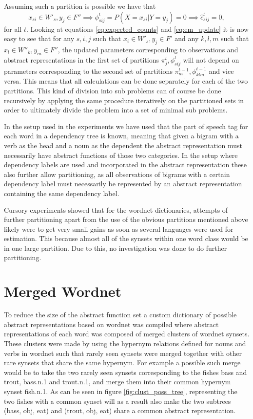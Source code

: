 Assuming such a partition is possible we have that
\begin{equation*}
    x_{si}\in W'_s, y_j\in F'' \implies \phi^t_{sij}=P(X = x_{si}|Y = y_j)=0 \implies \hat c^t_{sij}=0,
\end{equation*}
for all $t$. Looking at equations \ref{eq:expected_counts} and \ref{eq:em_update} it is now easy to see that for any $s,i,j$ such that $x_i \in W'_s, y_j\in F'$ and any $k,l,m$ such that $x_l \in W''_k, y_m\in F''$, the updated parameters corresponding to observations and abstract representations in the first set of partitions $\pi^t_j, \phi^t_{sij}$ will not depend on parameters corresponding to the second set of partitions $\pi^{t-1}_m, \phi^{t-1}_{klm}$ and vice versa. This means that all calculations can be done separately for each of the two partitions. This kind of division into sub problems can of course be done recursively by applying the same procedure iteratively on the partitioned sets in order to ultimately divide the problem into a set of minimal sub problems.

In the setup used in the experiments we have used that the part of speech tag for each word in a dependency tree is known, meaning that given a bigram with a verb as the head and a noun as the dependent the abstract representation must necessarily have abstract functions of those two categories. In the setup where dependency labels are used and incorporated in the abstract representation these also further allow partitioning, as all observations of bigrams with a certain dependency label must necessarily be represented by an abstract representation containing the same dependency label.

Cursory experiments showed that for the wordnet dictionaries, attempts of further partitioning apart from the use of the obvious partitions mentioned above likely were to get very small gains as soon as several languages were used for estimation. This because almost all of the synsets within one word class would be in one large partition. Due to this, no investigation was done to do further partitioning.

\section{Merged Wordnet}
\label{section:cluster}
To reduce the size of the abstract function set a custom dictionary of possible abstract representations based on wordnet was compiled where abstract representations of each word was composed of merged clusters of wordnet synsets. These clusters were made by using the hypernym relations defined for nouns and verbs in wordnet such that rarely seen synsets were merged together with other rare synsets that share the same hypernym. For example a possible such merge would be to take the two rarely seen synsets corresponding to the fishes bass and trout, bass.n.1 and trout.n.1, and merge them into their common hypernym synset fish.n.1. As can be seen in figure \ref{fig:clust_poss_tree}, representing the two fishes with a common synset will as a result also make the two subtrees (bass, obj, eat) and (trout, obj, eat) share a common abstract representation. 

